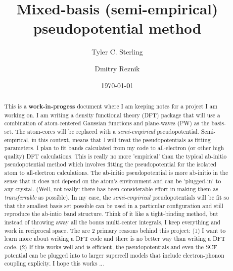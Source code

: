 \documentclass[prb,aps,11pt,superscriptaddress,floatfix]{revtex4-2}
\begin{document}
\title{Mixed-basis (semi-empirical) pseudopotential method}

\author{Tyler C. Sterling}

\author{Dmitry Reznik}


\date{\today}

\begin{abstract}
	This is a \textbf{work-in-progess} document where I am keeping notes for a project I am working on. I am writing a density functional theory (DFT) package that will use a combination of atom-centered Gaussian functions and plane-waves (PW) as the basis-set. The atom-cores will be replaced with a \emph{semi-empirical} pseudopotential. Semi-empirical, in this context, means that I will treat the pseudopotentials as fitting parameters. I plan to fit bands calculated from my code to all-electron (or other high quality) DFT calculations. This is really no more 'empirical' than the typical ab-initio pseudopotential method which involves fitting the pseudopotential for the isolated atom to all-electron calculations. The ab-initio pseudopotential is more ab-initio in the sense that it does not depend on the atom's environment and can be 'plugged-in' to any crystal. (Well, not really: there has been considerable effort in making them as \emph{transferrable} as possible). In my case, the \emph{semi-empirical} pseudopotentials will be fit so that the smallest basis set possible can be used in a particular configuration and still reproduce the ab-intio band structure. Think of it like a tight-binding method, but instead of throwing away all the bonus multi-center integrals, I keep everything and work in reciprocal space. The are 2 primary reasons behind this project: (1) I want to learn more about writing a DFT code and there is no better way than writing a DFT code. (2) If this works well and is efficient, the pseudopotentials and even the SCF potential can be plugged into to larger supercell models that include electron-phonon coupling explicity. I hope this works ... 
\end{abstract}
\end{document}

